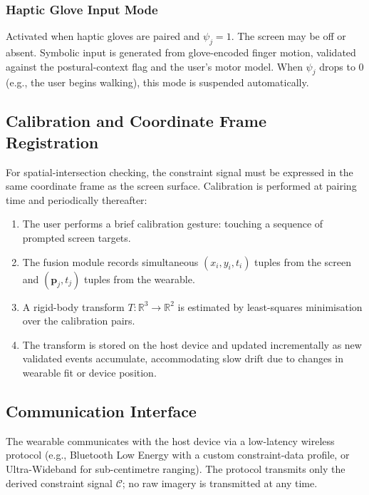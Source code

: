 \documentclass[11pt,letterpaper]{article}
\begin{document}
\subsubsection{Haptic Glove Input Mode}

Activated when haptic gloves are paired and $\psi_j = 1$. The screen may be off or
absent. Symbolic input is generated from glove-encoded finger motion, validated
against the postural-context flag and the user's motor model. When $\psi_j$ drops to
0 (e.g., the user begins walking), this mode is suspended automatically.

\subsection{Calibration and Coordinate Frame Registration}

For spatial-intersection checking, the constraint signal must be expressed in the
same coordinate frame as the screen surface. Calibration is performed at pairing
time and periodically thereafter:

\begin{enumerate}[leftmargin=2em, label=\arabic*.]
  \item The user performs a brief calibration gesture: touching a sequence of
        prompted screen targets.
  \item The fusion module records simultaneous $(x_i, y_i, t_i)$ tuples from the
        screen and $(\mathbf{p}_j, t_j)$ tuples from the wearable.
  \item A rigid-body transform $T: \mathbb{R}^3 \to \mathbb{R}^2$ is estimated by
        least-squares minimisation over the calibration pairs.
  \item The transform is stored on the host device and updated incrementally as
        new validated events accumulate, accommodating slow drift due to changes
        in wearable fit or device position.
\end{enumerate}

\subsection{Communication Interface}

The wearable communicates with the host device via a low-latency wireless protocol
(e.g., Bluetooth Low Energy with a custom constraint-data profile, or Ultra-Wideband
for sub-centimetre ranging). The protocol transmits only the derived constraint
signal $\mathcal{C}$; no raw imagery is transmitted at any time.
\end{document}
